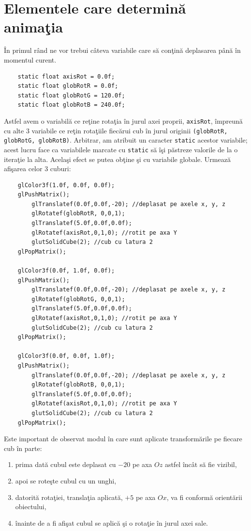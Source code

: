 \section{Elementele care determin\u a anima\c tia}
\^ In primul r\^ and ne vor trebui c\^ ateva variabile care s\u a con\c tin\u a deplasarea p\^ an\u a \^ in momentul curent.    
\begin{lstlisting}
    static float axisRot = 0.0f;
    static float globRotR = 0.0f;
    static float globRotG = 120.0f;
    static float globRotB = 240.0f;
\end{lstlisting}
Astfel avem o variabil\u a ce re\c tine rota\c tia \^ in jurul axei proprii, {\tt axisRot}, \^ impreun\u a cu alte $3$ variabile ce re\c tin rota\c tiile fiec\u arui cub \^ in jurul originii {\tt (globRotR, globRotG, globRotB)}. Arbitrar, am atribuit un caracter {\tt static} acestor va\-ria\-bi\-le; acest lucru face ca variabilele marcate cu {\tt static} s\u a \^ i\c si p\u astreze valorile de la o itera\c tie la alta. Acela\c si efect se putea ob\c tine \c si cu variabile globale. Urmeaz\u a afi\c sarea celor $3$ cuburi:
\begin{lstlisting}
    glColor3f(1.0f, 0.0f, 0.0f);
    glPushMatrix();
        glTranslatef(0.0f,0.0f,-20); //deplasat pe axele x, y, z
        glRotatef(globRotR, 0,0,1);
        glTranslatef(5.0f,0.0f,0.0f);
        glRotatef(axisRot,0,1,0); //rotit pe axa Y
        glutSolidCube(2); //cub cu latura 2
    glPopMatrix();
    
    glColor3f(0.0f, 1.0f, 0.0f);
    glPushMatrix();
        glTranslatef(0.0f,0.0f,-20); //deplasat pe axele x, y, z
        glRotatef(globRotG, 0,0,1);
        glTranslatef(5.0f,0.0f,0.0f);
        glRotatef(axisRot,0,1,0); //rotit pe axa Y
        glutSolidCube(2); //cub cu latura 2
    glPopMatrix();
    
    glColor3f(0.0f, 0.0f, 1.0f);
    glPushMatrix();
        glTranslatef(0.0f,0.0f,-20); //deplasat pe axele x, y, z
        glRotatef(globRotB, 0,0,1);
        glTranslatef(5.0f,0.0f,0.0f);
        glRotatef(axisRot,0,1,0); //rotit pe axa Y
        glutSolidCube(2); //cub cu latura 2
    glPopMatrix();
\end{lstlisting}
Este important de observat modul \^ in care sunt aplicate transform\u arile pe fiecare cub \^ in parte:
\begin{enumerate}
\item prima dat\u a cubul este deplasat cu $-20$ pe axa $Oz$ astfel \^ inc\^ at s\u a fie vizibil,
\item apoi se rote\c ste cubul cu un unghi,
\item datorit\u a rota\c tiei, transla\c tia aplicat\u a, $+5$ pe axa $Ox$, va fi conform\u a orient\u arii obiectului,
\item \^ inainte de a fi afi\c sat cubul se aplic\u a \c si o rota\c tie \^ in jurul axei sale.
\end{enumerate}
